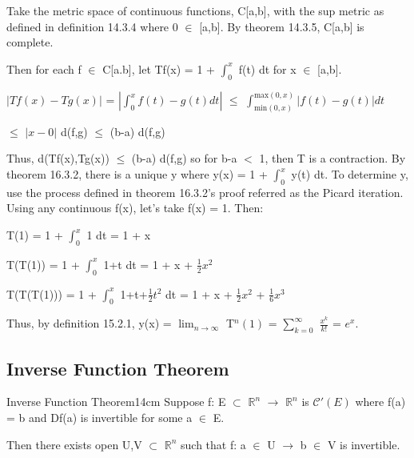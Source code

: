     \begin{tbox}
        Take the metric space of continuous functions, C[a,b],
        with the sup metric as defined in {\color{blue} definition 14.3.4}
        where 0 $\in$ [a,b].
        By {\color{red} theorem 14.3.5}, C[a,b] is complete.
        
        Then for each f $\in$ C[a.b], let Tf(x) = 1 + $\int_0^x$ f(t) dt
        for x $\in$ [a,b].
        
        \hspace{0.5cm}
        $|Tf(x) - Tg(x)|$
        = $|\int_0^x f(t)-g(t) dt|$
        $\leq$ $\int_{\text{min}(0,x)}^{\text{max}(0,x)} | f(t)-g(t) | dt$

        \hspace{3.55cm}
        $\leq$ $|x-0|$ d(f,g)
        $\leq$ (b-a) d(f,g)

        Thus, d(Tf(x),Tg(x)) $\leq$ (b-a) d(f,g) so for b-a $<$ 1, then T
        is a contraction.
        By {\color{red} theorem 16.3.2},
        there is a unique y where y(x) = 1 + $\int_0^x$ y(t) dt.
        To determine y, use the process defined in {\color{red} theorem 16.3.2}'s
        proof referred as the Picard iteration. Using any continuous f(x),
        let's take f(x) = 1. Then:

        \hspace{0.5cm}
        T(1)
        = 1 + $\int_0^x$ 1 dt
        = 1 + x

        \hspace{0.5cm}
        T(T(1))
        = 1 + $\int_0^x$ 1+t dt
        = 1 + x + $\frac{1}{2}x^2$

        \hspace{0.5cm}
        T(T(T(1)))
        = 1 + $\int_0^x$ 1+t+$\frac{1}{2}t^2$ dt
        = 1 + x + $\frac{1}{2}x^2$ + $\frac{1}{6}x^3$

        Thus, by {\color{blue} definition 15.2.1}, y(x)
        = $\lim_{n \rightarrow \infty}$ T$^n(1)$
        = $\sum_{k=0}^{\infty}$ $\frac{x^k}{k!}$ = $e^x$.
    \end{tbox}

    \newpage



\subsection{ Inverse Function Theorem }

    \begin{wtheorem}{Inverse Function Theorem}{14cm}
        Suppose f: E $\subset$ $\mathbb{R}^n$ $\rightarrow$ $\mathbb{R}^n$
        is $\mathscr{C}'(E)$ where f(a) = b and
        Df(a) is invertible for some a $\in$ E.

        Then there exists open U,V $\subset$ $\mathbb{R}^n$ such that
        f: a $\in$ U $\rightarrow$ b $\in$ V is invertible.
    \end{wtheorem}

